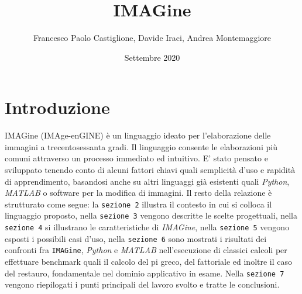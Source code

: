\documentclass[10pt]{article}
\title{IMAGine}
\author{Francesco Paolo Castiglione, Davide Iraci, Andrea Montemaggiore}
\date{Settembre 2020}
\begin{document}
	\maketitle
	\tableofcontents
	\clearpage

\section{Introduzione}IMAGine (IMAge-enGINE) è un linguaggio ideato per l’elaborazione delle immagini a trecentosessanta gradi. Il linguaggio consente le elaborazioni più comuni attraverso un processo immediato ed intuitivo.
E’ stato pensato e sviluppato tenendo conto di alcuni fattori chiavi quali semplicità d’uso e rapidità di apprendimento, basandosi anche su altri linguaggi già esistenti quali \textit{Python}, \textit{MATLAB} o software per la modifica di immagini.\newline
Il resto della relazione è strutturato come segue: la \texttt{sezione 2} illustra il contesto in cui si colloca il linguaggio proposto, nella \texttt{sezione 3} vengono descritte le scelte progettuali, nella \texttt{sezione 4} si illustrano le caratteristiche di \textit{IMAGine},  nella \texttt{sezione 5} vengono esposti i possibili casi d'uso, nella \texttt{sezione 6} sono mostrati i risultati dei confronti fra \texttt{IMAGine}, \textit{Python} e \textit{MATLAB} nell'esecuzione di classici calcoli per effettuare benchmark quali il calcolo del pi greco, del fattoriale ed inoltre il caso del restauro, fondamentale nel dominio applicativo in esame. Nella \texttt{sezione 7} vengono riepilogati i punti principali del lavoro svolto e tratte le conclusioni.
\clearpage
\end{document}
